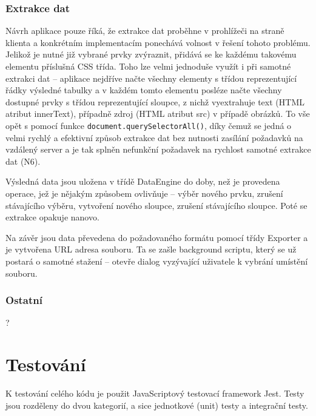 \documentclass[thesis=B,czech]{FITthesis}[2012/06/26]
\begin{document}
\subsection{Extrakce dat}
Návrh aplikace pouze říká, že extrakce dat proběhne v prohlížeči na straně klienta a konkrétním implementacím ponechává volnost v řešení tohoto problému. Jelikož je nutné již vybrané prvky zvýraznit, přidává se ke každému takovému elementu příslušná CSS třída. Toho lze velmi jednoduše využít i při samotné extrakci dat -- aplikace nejdříve načte všechny elementy s třídou reprezentující řádky výsledné tabulky a v každém tomto elementu posléze načte všechny dostupné prvky s třídou reprezentující sloupce, z nichž vyextrahuje text (HTML atribut \textsf{innerText}), případně zdroj (HTML atribut \textsf{src}) v případě obrázků. To vše opět s pomocí funkce \verb|document.querySelectorAll()|, díky čemuž se jedná o velmi rychlý a efektivní způsob extrakce dat bez nutnosti zasílání požadavků na vzdálený server a je tak splněn nefunkční požadavek na rychlost samotné extrakce dat (N6).

Výsledná data jsou uložena v třídě DataEngine do doby, než je provedena operace, jež je nějakým způsobem ovlivňuje -- výběr nového prvku, zrušení stávajícího výběru, vytvoření nového sloupce, zrušení stávajícího sloupce. Poté se extrakce opakuje nanovo.

Na závěr jsou data převedena do požadovaného formátu pomocí třídy Exporter a je vytvořena URL adresa souboru. Ta se zašle background scriptu, který se už postará o samotné stažení -- otevře dialog vyzývající uživatele k vybrání umístění souboru.

\subsection{Ostatní}
?


\chapter{Testování}
K testování celého kódu je použit JavaScriptový testovací framework Jest. Testy jsou rozděleny do dvou kategorií, a sice jednotkové (unit) testy a integrační testy.

\end{document}

